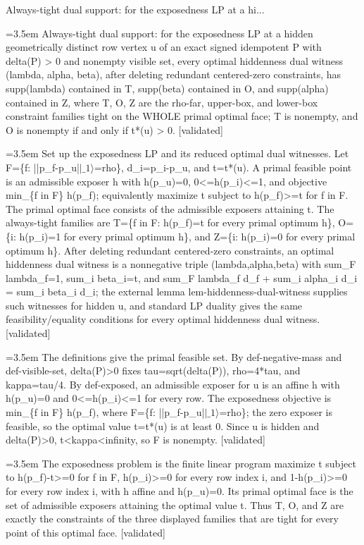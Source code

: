 \documentclass{article}
\newcommand{\step}[1]{\par\noindent\hangindent=3.5em\hangafter=1%
  \makebox[3.5em][l]{\textbf{#1.}}}
\newcommand{\steptag}[1]{\hfill{\small\textsf{[#1]}}}
\begin{document}
\begin{proofbox}{Always-tight dual support: for the exposedness LP at a hi...}
\step{1} Always-tight dual support: for the exposedness LP at a hidden geometrically distinct row vertex u of an exact signed idempotent P with delta(P) > 0 and nonempty visible set, every optimal hiddenness dual witness (lambda, alpha, beta), after deleting redundant centered-zero constraints, has supp(lambda) contained in T, supp(beta) contained in O, and supp(alpha) contained in Z, where T, O, Z are the rho-far, upper-box, and lower-box constraint families tight on the WHOLE primal optimal face; T is nonempty, and O is nonempty if and only if t*(u) > 0. \steptag{validated} \\[6pt]
\step{1.1} Set up the exposedness LP and its reduced optimal dual witnesses. Let F=\{f: ||p\_f-p\_u|$|\_1\rangle$=rho\}, d\_i=p\_i-p\_u, and t=t*(u). A primal feasible point is an admissible exposer h with h(p\_u)=0, 0<=h(p\_i)<=1, and objective min\_\{f in F\} h(p\_f); equivalently maximize t subject to h(p\_f)>=t for f in F. The primal optimal face consists of the admissible exposers attaining t. The always-tight families are T=\{f in F: h(p\_f)=t for every primal optimum h\}, O=\{i: h(p\_i)=1 for every primal optimum h\}, and Z=\{i: h(p\_i)=0 for every primal optimum h\}. After deleting redundant centered-zero constraints, an optimal hiddenness dual witness is a nonnegative triple (lambda,alpha,beta) with sum\_F lambda\_f=1, sum\_i beta\_i=t, and sum\_F lambda\_f d\_f + sum\_i alpha\_i d\_i = sum\_i beta\_i d\_i; the external lemma lem-hiddenness-dual-witness supplies such witnesses for hidden u, and standard LP duality gives the same feasibility/equality conditions for every optimal hiddenness dual witness. \steptag{validated} \\[6pt]
\step{1.1.1} The definitions give the primal feasible set. By def-negative-mass and def-visible-set, delta(P)>0 fixes tau=sqrt(delta(P)), rho=4*tau, and kappa=tau/4. By def-exposed, an admissible exposer for u is an affine h with h(p\_u)=0 and 0<=h(p\_i)<=1 for every row. The exposedness objective is min\_\{f in F\} h(p\_f), where F=\{f: ||p\_f-p\_u|$|\_1\rangle$=rho\}; the zero exposer is feasible, so the optimal value t=t*(u) is at least 0. Since u is hidden and delta(P)>0, t<kappa<infinity, so F is nonempty. \steptag{validated} \\[4pt]
\step{1.1.2} The exposedness problem is the finite linear program maximize t subject to h(p\_f)-t>=0 for f in F, h(p\_i)>=0 for every row index i, and 1-h(p\_i)>=0 for every row index i, with h affine and h(p\_u)=0. Its primal optimal face is the set of admissible exposers attaining the optimal value t. Thus T, O, and Z are exactly the constraints of the three displayed families that are tight for every point of this optimal face. \steptag{validated} \\[4pt]

\end{proofbox}
\end{document}
